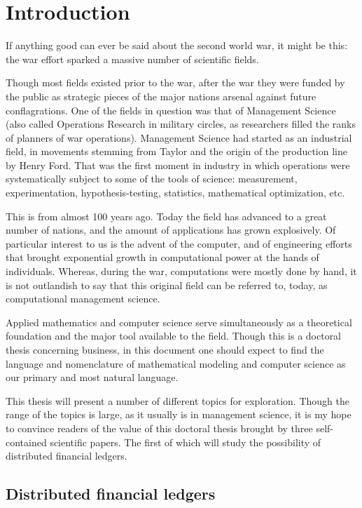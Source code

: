 \chapter{Introduction}
\bigskip

\noindent If anything good can ever be said about the second world war, it might be this: the war effort sparked a massive number of scientific fields.

Though most fields existed prior to the war, after the war they were funded by the public as strategic pieces of the major nations arsenal against future conflagrations. One of the fields in question was that of Management Science (also called Operations Research in military circles, as researchers filled the ranks of planners of war operations). Management Science had started as an industrial field, in movements stemming from Taylor and the origin of the production line by Henry Ford.  That was the first moment in industry in which operations were systematically subject to some of the tools of science: measurement, experimentation, hypothesis-testing, statistics, mathematical optimization, etc.

This is from almost 100 years ago. Today the field has advanced to a great number of nations, and the amount of applications has grown explosively.  Of particular interest to us is the advent of the computer, and of engineering efforts that brought exponential growth in computational power at the hands of individuals.  Whereas, during the war, computations were mostly done by hand, it is not outlandish to say that this original field can be referred to, today, as computational management science.

Applied mathematics and computer science serve simultaneously as a theoretical foundation and the major tool available to the field.  Though this is a doctoral thesis concerning business, in this document one should expect to find the language and nomenclature of mathematical modeling and computer science as our primary and most natural language.

This thesis will present a number of different topics for exploration. Though the range of the topics is large, as it usually is in management science, it is my hope to convince readers of the value of this doctoral thesis brought by three self-contained scientific papers.  The first of which will study the possibility of distributed financial ledgers.

\section{Distributed financial ledgers}

